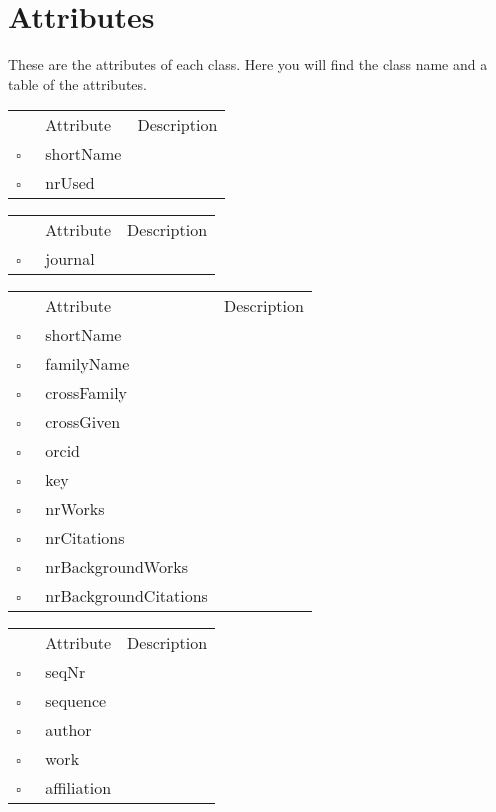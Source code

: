 \chapter{Attributes}
These are the attributes of each class. Here you will find the class name and a table of the attributes.     
\begin{table}
\caption{Affiliation  }

\begin{longtable}{llp{8cm}}
& Attribute & Description \\
$\square$\ & shortName &  \\
$\square$\ & nrUsed &  \\
\end{longtable}
\label{attr:Affiliation}
\end{table}

\clearpage
\begin{table}
\caption{Article  }

\begin{longtable}{llp{8cm}}
& Attribute & Description \\
$\square$\ & journal &  \\
\end{longtable}
\label{attr:Article}
\end{table}

\begin{table}
\caption{Author  }

\begin{longtable}{llp{8cm}}
& Attribute & Description \\
$\square$\ & shortName &  \\
$\square$\ & familyName &  \\
$\square$\ & crossFamily &  \\
$\square$\ & crossGiven &  \\
$\square$\ & orcid &  \\
$\square$\ & key &  \\
$\square$\ & nrWorks &  \\
$\square$\ & nrCitations &  \\
$\square$\ & nrBackgroundWorks &  \\
$\square$\ & nrBackgroundCitations &  \\
\end{longtable}
\label{attr:Author}
\end{table}

\begin{table}
\caption{Authorship  }

\begin{longtable}{llp{8cm}}
& Attribute & Description \\
$\square$\ & seqNr &  \\
$\square$\ & sequence &  \\
$\square$\ & author &  \\
$\square$\ & work &  \\
$\square$\ & affiliation &  \\
\end{longtable}
\label{attr:Authorship}
\end{table}

